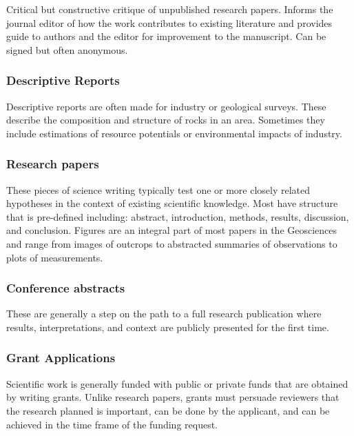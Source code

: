\documentclass[11pt,]{article}
\begin{document}
Critical but constructive critique of unpublished research papers.
Informs the journal editor of how the work contributes to existing
literature and provides guide to authors and the editor for improvement
to the manuscript. Can be signed but often anonymous.

\hypertarget{descriptive-reports}{%
\subsubsection{Descriptive Reports}\label{descriptive-reports}}

Descriptive reports are often made for industry or geological surveys.
These describe the composition and structure of rocks in an area.
Sometimes they include estimations of resource potentials or
environmental impacts of industry.

\hypertarget{research-papers}{%
\subsubsection{Research papers}\label{research-papers}}

These pieces of science writing typically test one or more closely
related hypotheses in the context of existing scientific knowledge. Most
have structure that is pre-defined including: abstract, introduction,
methods, results, discussion, and conclusion. Figures are an integral
part of most papers in the Geosciences and range from images of outcrops
to abstracted summaries of observations to plots of measurements.

\hypertarget{conference-abstracts}{%
\subsubsection{Conference abstracts}\label{conference-abstracts}}

These are generally a step on the path to a full research publication
where results, interpretations, and context are publicly presented for
the first time.

\hypertarget{grant-applications}{%
\subsubsection{Grant Applications}\label{grant-applications}}

Scientific work is generally funded with public or private funds that
are obtained by writing grants. Unlike research papers, grants must
persuade reviewers that the research planned is important, can be done
by the applicant, and can be achieved in the time frame of the funding
request.
\end{document}
